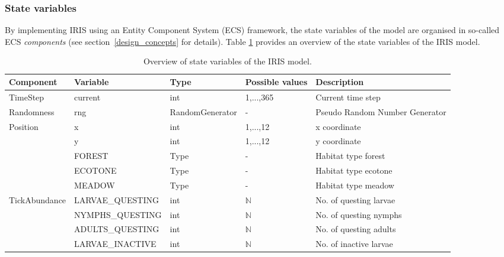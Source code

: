 \documentclass[a4paper, 11pt]{scrartcl}
\begin{document}
\subsubsection{State variables}
By implementing IRIS using an Entity Component System (ECS) framework, the state variables of the model are organised in so-called ECS \emph{components} (see section~\ref{design_concepts} for details). Table \ref{tab:state_variables} provides an overview of the state variables of the IRIS model.

\begin{table}[H]
\caption[Overview of state variables of the IRIS model.]{Overview of state variables of the IRIS model.}
\label{tab:state_variables}
\begin{tabularx}{\textwidth}{lllll}
\toprule
\textbf{Component} & \textbf{Variable} & \textbf{Type} & \textbf{Possible values} & \textbf{Description} \\
\midrule
\footnotesize{TimeStep} 	& \footnotesize{current} 			& int & 1,...,365 & \footnotesize{Current time step} \\
\footnotesize{Randomness} 	& \footnotesize{rng} 				& \footnotesize{RandomGenerator} & - & \footnotesize{Pseudo Random Number Generator} \\
\multirow{3}{*}{\footnotesize{Position}} & \footnotesize{x}  	& int  & 1,...,12  & \footnotesize{x coordinate} \\
							& \footnotesize{y}    				& int  & 1,...,12 & \footnotesize{y coordinate} \\
\multirow{3}{*}{\footnotesize{Habitat}} & \footnotesize{FOREST} & Type & - & \footnotesize{Habitat type forest} \\
							& \footnotesize{ECOTONE} 			& Type & - & \footnotesize{Habitat type ecotone} \\
							& \footnotesize{MEADOW} 			& Type & - & \footnotesize{Habitat type meadow} \\
\midrule
\multirow{11}{*}{\footnotesize{TickAbundance}} & \footnotesize{LARVAE\_QUESTING}	& int & $\mathbb{N}$ & \footnotesize{No. of questing larvae} \\
							& \footnotesize{NYMPHS\_QUESTING}	& int & $\mathbb{N}$ & \footnotesize{No. of questing nymphs} \\
							& \footnotesize{ADULTS\_QUESTING}	& int & $\mathbb{N}$ & \footnotesize{No. of questing adults} \\
							& \footnotesize{LARVAE\_INACTIVE}	& int & $\mathbb{N}$ & \footnotesize{No. of inactive larvae} \\

\end{tabularx}
\end{table}
\end{document}
